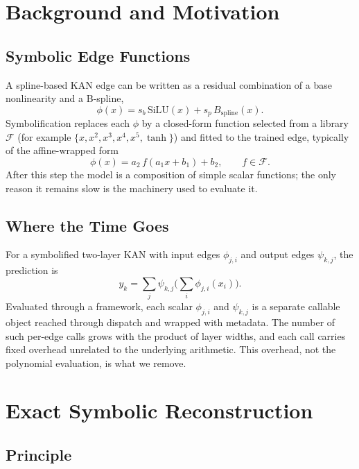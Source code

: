 \documentclass[conference]{IEEEtran}
\begin{document}
\section{Background and Motivation}

\subsection{Symbolic Edge Functions}

A spline-based KAN edge can be written as a residual combination of a base
nonlinearity and a B-spline,
\begin{equation}
\phi(x) = s_b\,\mathrm{SiLU}(x) + s_p\,B_{\mathrm{spline}}(x).
\end{equation}
Symbolification replaces each $\phi$ by a closed-form function selected from a
library $\mathcal{F}$ (for example $\{x,x^2,x^3,x^4,x^5,\tanh\}$) and fitted to
the trained edge, typically of the affine-wrapped form
\begin{equation}
\phi(x) = a_2\, f(a_1 x + b_1) + b_2, \qquad f \in \mathcal{F}.
\label{eq:symbolic_edge}
\end{equation}
After this step the model is a composition of simple scalar functions; the only
reason it remains slow is the machinery used to evaluate it.

\subsection{Where the Time Goes}

For a symbolified two-layer KAN with input edges $\phi_{j,i}$ and output edges
$\psi_{k,j}$, the prediction is
\begin{equation}
y_k = \sum_j \psi_{k,j}\!\Big(\sum_i \phi_{j,i}(x_i)\Big).
\end{equation}
Evaluated through a framework, each scalar $\phi_{j,i}$ and $\psi_{k,j}$ is a
separate callable object reached through dispatch and wrapped with metadata.
The number of such per-edge calls grows with the product of layer widths, and
each call carries fixed overhead unrelated to the underlying arithmetic. This
overhead, not the polynomial evaluation, is what we remove.

\section{Exact Symbolic Reconstruction}

\subsection{Principle}
\end{document}
